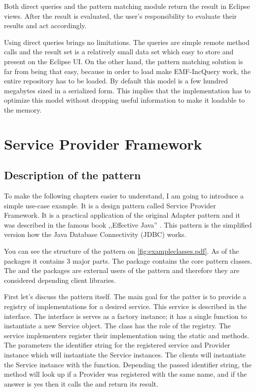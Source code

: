 Both direct queries and the pattern matching module return the result in Eclipse 
views. After the result is evaluated, the user's responsibility to evaluate their
results and act accordingly.

Using direct queries brings no limitations. The queries are simple remote method
calls and the result set is a relatively small data set which easy to store and
present on the Eclipse UI. On the other hand, the pattern matching solution is
far from being that easy, because in order to load make EMF-IncQuery work, the
entire repository has to be loaded. By default this model is a few hundred
megabytes sized in a serialized form. This implies that the implementation has to 
optimize this model without dropping useful information to make it loadable to 
the memory.

\section{Service Provider Framework}\label{sect:spf}

\subsection{Description of the pattern}

To make the following chapters easier to understand, I am going to introduce a
simple use-case example. It is a design pattern called Service Provider
Framework. It is a practical application of the original Adapter pattern and it
was described in the famous book ,,Effective Java'' \cite{Bloch08}. This pattern
is the simplified version how the Java Database Connectivity (JDBC) works.


You can see the structure of the pattern on
\autoref{fig:exampleclasses.pdf}. As of the packages it contains 3 major parts.
The  package contains the core pattern classes. The 
and the  packages are external users of the pattern and therefore
they are considered depending client libraries.

First let's discuss the pattern itself. The main goal for the patter is to
provide a registry of implementations for a desired service. This service is
described in the  interface. The  interface is
serves as a factory instance; it has a single function to instantiate a new
Service object. The  class has the role of the registry.
The service implementers register their implementation using the static
 and  methods. The
parameters the identifier string for the registered service and Provider
instance which will instantiate the Service instances. The clients will
instantiate the Service instance with the  function.
Depending the passed identifier string, the method will look up if a Provider
was registered with the same name, and if the answer is yes then it calls the
 and return its result.

